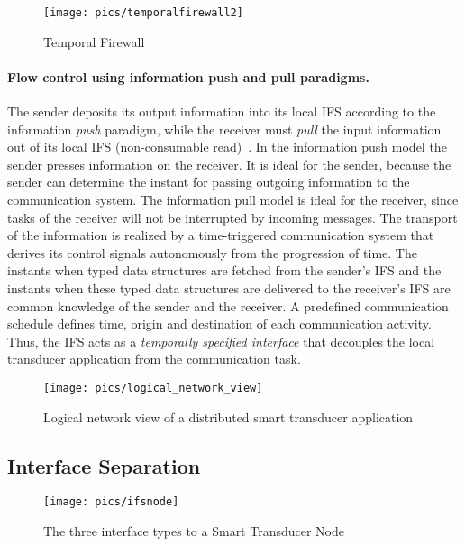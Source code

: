 \documentclass[11pt,a4paper,]{article}
\begin{document}
\begin{figure}[htb]
  \centerline{\texttt{[image: pics/temporalfirewall2]}}
  \caption{Temporal Firewall}
  \label{fig:temporalfirewall}
\end{figure}

\paragraph{Flow control using information push and pull paradigms.}

The sender deposits its output information into its local \ac{IFS}
according to the information {\em push} paradigm, while the receiver
must {\em pull} the input information out of its local \ac{IFS}
(non-consumable read)~\cite{elmenreich:01}. In the information push
model the sender presses information on the receiver. It is ideal
for the sender, because the sender can determine the instant for
passing outgoing information to the communication system. The
information pull model is ideal for the receiver, since tasks of the
receiver will not be interrupted by incoming messages. The transport
of the information is realized by a time-triggered communication
system that derives its control signals autonomously from the
progression of time. The instants when typed data structures are
fetched from the sender's \ac{IFS} and the instants when these typed
data structures are delivered to the receiver's \ac{IFS} are common
knowledge of the sender and the receiver. A predefined communication
schedule defines time, origin and destination of each communication
activity. Thus, the \ac{IFS} acts as a {\em temporally specified
interface} that decouples the local transducer application from the
communication task.

\begin{figure}[htb]
  \centerline{\texttt{[image: pics/logical\_network\_view]}}
  \caption{Logical network view of a distributed smart transducer application}
  \label{fig:logische_netzstruktur}
\end{figure}

\subsection{Interface Separation}

\begin{figure}[htb]
  \centerline{\texttt{[image: pics/ifsnode]}}
  \caption{The three interface types to a Smart Transducer Node}
  \label{fig:ifsnode}
\end{figure}
\end{document}
